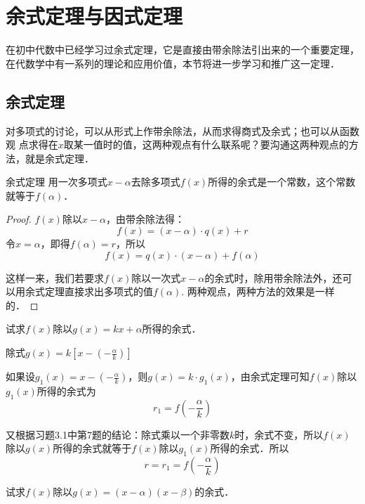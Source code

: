 \section{余式定理与因式定理}
在初中代数中已经学习过余式定理，它是直接由带余除法引出来的一个重要定理，在代数学中有一系列的理论和应用价值，本节将进一步学习和推广这一定理．

\subsection{余式定理}

对多项式的讨论，可以从形式上作带余除法，从而求得商式及余式；也可以从函数观 点求得在$x$取某一值时的值，这两种观点有什么联系呢？要沟通这两种观点的方法，就是余式定理．

\begin{blk}{余式定理}
    用一次多项式$x-\alpha$去除多项式$f(x)$所得的余式是一个常数，这个常数就等于$f(\alpha)$．
\end{blk}

\begin{proof}
    $f(x)$除以$x-\alpha$，由带余除法得：
\[f(x)=(x-\alpha)\cdot q(x)+r\]
令$x=\alpha$，即得$f(\alpha)=r$，所以
\[f(x)=q(x)\cdot (x-\alpha)+f(\alpha)\]

这样一来，我们若要求$f(x)$除以一次式$x-\alpha$的余式时，除用带余除法外，还可以用余式定理直接求出多项式的值$f(\alpha)$. 两种观点，两种方法的效果是一样的．
\end{proof}

\begin{example}
    试求$f(x)$除以$g(x)=kx+\alpha$所得的余式．
\end{example}

\begin{solution}
除式$g(x)=k\left[x-\left(-\frac{\alpha}{k}\right)\right]$

如果设$g_1(x)=x-\left(-\frac{\alpha}{k}\right)$，则$g(x)=k\cdot g_1(x)$，由余式定理可知$f(x)$除以$g_1(x)$所得的余式为
\[r_1=f\left(-\frac{\alpha}{k}\right)\]
    
又根据习题3.1中第7题的结论：除式乘以一个非零数$k$时，余式不变，所以$f(x)$除以$g(x)$所得的余式就等于$f(x)$除以$g_1(x)$所得的余式．所以
\[r=r_1=f\left(-\frac{\alpha}{k}\right)\]
\end{solution}


\begin{example}
    试求$f(x)$除以$g(x)=(x-\alpha)(x-\beta)$的余式．
\end{example}

